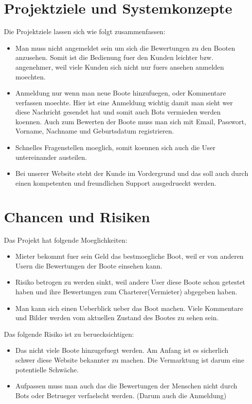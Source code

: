 \documentclass[12pt]{article}
\theoremstyle{definition}
\begin{document}
\pagebreak

\section{Projektziele und Systemkonzepte}
Die Projektziele lassen sich wie folgt zusammenfassen:
\begin{itemize}
\item Man muss nicht angemeldet sein um sich die Bewertungen zu den Booten anzusehen. Somit ist die Bedienung fuer den Kunden leichter bzw. angenehmer, weil viele Kunden sich nicht nur fuers ansehen anmelden moechten.
\item Anmeldung nur wenn man neue Boote hinzufuegen, oder Kommentare verfassen moechte. Hier ist eine Anmeldung wichtig damit man sieht wer diese Nachricht gesendet hat und somit auch Bots vermieden werden koennen.
Auch zum Bewerten der Boote muss man sich mit Email, Passwort, Vorname, Nachname und Geburtsdatum registrieren.
\item Schnelles Fragenstellen moeglich, somit koennen sich auch die User untereinander austeilen.
\item Bei unserer Website steht der Kunde im Vordergrund und das soll auch durch einen kompetenten und freundlichen Support ausgedrueckt werden. 
\end{itemize}

\pagebreak

\section{Chancen und Risiken}
Das Projekt hat folgende Moeglichkeiten:
\begin{itemize}
\item Mieter bekommt fuer sein Geld das bestmoegliche Boot, weil er von anderen Usern die Bewertungen der Boote einsehen kann.
\item Risiko betrogen zu werden sinkt, weil andere User diese Boote schon getestet haben und ihre Bewertungen zum Charterer(Vermieter) abgegeben haben.
\item Man kann sich einen Ueberblick ueber das Boot machen. Viele Kommentare und Bilder werden vom aktuellen Zustand des Bootes zu sehen sein.
\end{itemize}

Das folgende Risiko ist zu beruecksichtigen:
\begin{itemize}
\item Das nicht viele Boote hinzugefuegt werden. Am Anfang ist es sicherlich schwer diese Website bekannter zu machen. Die Vermarktung ist darum eine potentielle Schwäche.
\item Aufpassen muss man auch das die Bewertungen der Menschen nicht durch Bots oder Betrueger verfaelscht werden. (Darum auch die Anmeldung)
\end{itemize}
\end{document}
